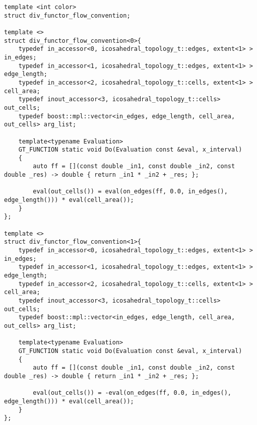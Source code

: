 \documentclass[12pt]{article}
\begin{document}
\begin{lstlisting}
template <int color>
struct div_functor_flow_convention;

template <>
struct div_functor_flow_convention<0>{
    typedef in_accessor<0, icosahedral_topology_t::edges, extent<1> > in_edges;
    typedef in_accessor<1, icosahedral_topology_t::edges, extent<1> > edge_length;
    typedef in_accessor<2, icosahedral_topology_t::cells, extent<1> > cell_area;
    typedef inout_accessor<3, icosahedral_topology_t::cells> out_cells;
    typedef boost::mpl::vector<in_edges, edge_length, cell_area, out_cells> arg_list;

    template<typename Evaluation>
    GT_FUNCTION static void Do(Evaluation const &eval, x_interval)
    {
        auto ff = [](const double _in1, const double _in2, const double _res) -> double { return _in1 * _in2 + _res; };

        eval(out_cells()) = eval(on_edges(ff, 0.0, in_edges(), edge_length())) * eval(cell_area());
    }
};

template <>
struct div_functor_flow_convention<1>{
    typedef in_accessor<0, icosahedral_topology_t::edges, extent<1> > in_edges;
    typedef in_accessor<1, icosahedral_topology_t::edges, extent<1> > edge_length;
    typedef in_accessor<2, icosahedral_topology_t::cells, extent<1> > cell_area;
    typedef inout_accessor<3, icosahedral_topology_t::cells> out_cells;
    typedef boost::mpl::vector<in_edges, edge_length, cell_area, out_cells> arg_list;

    template<typename Evaluation>
    GT_FUNCTION static void Do(Evaluation const &eval, x_interval)
    {
        auto ff = [](const double _in1, const double _in2, const double _res) -> double { return _in1 * _in2 + _res; };

        eval(out_cells()) = -eval(on_edges(ff, 0.0, in_edges(), edge_length())) * eval(cell_area());
    }
};

\end{lstlisting}
\end{document}

